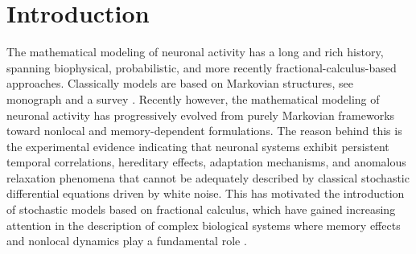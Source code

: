\documentclass[11pt,reqno,oneside, a4paper]{amsart}
\numberwithin{equation}{section}
\theoremstyle{remark}
\begin{document}
\section{Introduction}
The mathematical modeling of neuronal activity has a long and rich history, spanning biophysical, probabilistic, and more recently fractional-calculus-based approaches. Classically models are based on Markovian structures, see monograph 
\cite{Tuckwell1988a} and a survey \cite{SacerdoteGiraudo2013}. Recently however, 
the mathematical modeling of neuronal activity has progressively evolved from purely Markovian frameworks toward nonlocal and memory-dependent formulations. The reason behind this is the experimental evidence indicating that neuronal systems exhibit persistent temporal correlations, hereditary effects, adaptation mechanisms, and anomalous relaxation phenomena that cannot be adequately described by classical stochastic differential equations driven by white noise. This has motivated the introduction of stochastic models based on fractional calculus, which have gained increasing attention in the description of complex biological systems where memory effects and nonlocal dynamics play a fundamental role \cite{Magin2006,Mainardi2010,MeerschaertSikorskii2012,MetzlerKlafter2000}.
\end{document}
